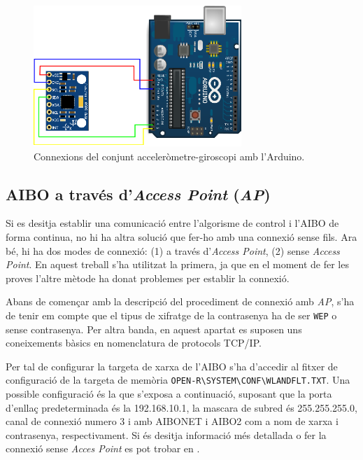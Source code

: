 \documentclass[12pt,a4paper,final,twoside]{report}
\begin{document}
\begin{figure}[bt]
\centering
\includegraphics[width=0.7\textwidth]{Imatges/connexions-sensor-Arduino.eps}
\caption{Connexions del conjunt acceleròmetre-giroscopi amb l'Arduino.}
\label{fig:connexions-sensor-Arduino}
\end{figure}


\subsection{AIBO a través d'\texttt{}\textit{Access Point} (\textit{AP})}
\label{AIBO-AP}

Si es desitja establir una comunicació entre l'algorisme de control i l'AIBO de forma continua, no hi ha altra solució que fer-ho amb una connexió sense fils. Ara bé, hi ha dos modes de connexió: (1) a través d'\textit{Access Point}, (2) sense \textit{Access Point}. En aquest treball s'ha utilitzat la primera, ja que en el moment de fer les proves l'altre mètode ha donat problemes per establir la connexió.

Abans de començar amb la descripció del procediment de connexió amb \textit{AP}, s'ha de tenir em compte que el tipus de xifratge de la contrasenya ha de ser \texttt{WEP} o sense contrasenya. Per altra banda, en aquest apartat es suposen uns coneixements bàsics en nomenclatura de protocols TCP/IP.

Per tal de configurar la targeta de xarxa de l'AIBO s'ha d'accedir al fitxer de configuració de la targeta de memòria \texttt{OPEN-R\textbackslash SYSTEM\textbackslash CONF\textbackslash WLANDFLT.TXT}. Una possible configuració és la que s'exposa a continuació, suposant que la porta d'enllaç predeterminada és la 192.168.10.1, la mascara de subred és 255.255.255.0, canal de connexió numero 3 i amb AIBONET i AIBO2 com a nom de xarxa i contrasenya, respectivament. Si és desitja informació més detallada o fer la connexió sense \textit{Acces Point} es pot trobar en \cite{Tellez2004}.
\end{document}
